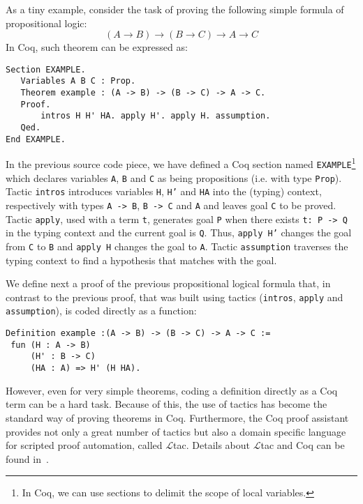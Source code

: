 \documentclass[sigconf]{acmart}
\begin{document}
As a tiny example, consider the task of proving the following simple
formula of propositional logic:
\[
(A \to B)\to (B\to C) \to A \to C
\]
In Coq, such theorem can be expressed as:
\begin{verbatim}
Section EXAMPLE.
   Variables A B C : Prop.
   Theorem example : (A -> B) -> (B -> C) -> A -> C.
   Proof.
       intros H H' HA. apply H'. apply H. assumption. 
   Qed.
End EXAMPLE.
\end{verbatim}
In the previous source code piece, we have defined a Coq section named
\texttt{EXAMPLE}\footnote{In Coq, we can use sections to delimit the
  scope of local variables.} which declares variables \texttt{A},
\texttt{B} and \texttt{C} as being propositions (i.e. with type
\texttt{Prop}). Tactic \texttt{intros} introduces variables
\texttt{H}, \texttt{H'} and \texttt{HA} into the (typing) context,
respectively with types \texttt{A -> B}, \texttt{B -> C} and
\texttt{A} and leaves goal \texttt{C} to be proved. Tactic
\texttt{apply}, used with a term \texttt{t}, generates goal
\texttt{P}
when there exists \texttt{t: P -> Q} in the typing context and the
current goal is \texttt{Q}. Thus, \texttt{apply H'} changes the goal
from \texttt{C} to \texttt{B} and \texttt{apply H}
changes the goal to \texttt{A}. Tactic \texttt{assumption}
traverses the typing context to find a hypothesis that matches with the goal.

We define next a proof of the previous propositional logical formula
that, in contrast to the previous proof, that was built using tactics
(\texttt{intros}, \texttt{apply} and \texttt{assumption}), is coded
directly as a function:
\begin{verbatim}
Definition example :(A -> B) -> (B -> C) -> A -> C :=
 fun (H : A -> B)
     (H' : B -> C)
     (HA : A) => H' (H HA).
\end{verbatim}
However, even for very simple theorems, coding a definition directly
as a Coq term can be a hard task. Because of this, the use of tactics
has become the standard way of proving theorems in Coq. Furthermore,
the Coq proof assistant provides not only a great number of tactics
but also a domain specific language for scripted proof automation,
called $\mathcal{L}$tac. Details about $\mathcal{L}$tac and Coq can be found
in~\cite{Chlipala13,Bertot10,manual_coq}.
\end{document}
